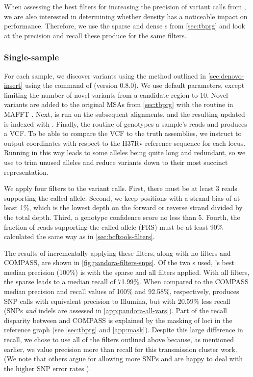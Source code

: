 When assessing the best filters for increasing the precision of variant calls from \pandora{}, we are also interested in determining whether \panrg{} density has a noticeable impact on performance. Therefore, we use the sparse and dense \panrg{}s from \autoref{sec:tbprg} and look at the precision and recall these produce for the same filters.

\subsubsection{Single-sample}
\label{sec:map-var-calls}

For each sample, we discover \denovo{} variants using the method outlined in \autoref{sec:denovo-insert} using the  command of \pandora{} (version 0.8.0). We use default parameters, except limiting the number of novel variants from a candidate region to 10. Novel variants are added to the original MSAs from \autoref{sec:tbprg} with the  routine in MAFFT \cite{katoh2012}. Next, \makeprg{} is run on the subsequent alignments, and the resulting updated \panrg{} is indexed with \pandora{}. Finally, the  routine of \pandora{} genotypes a sample's reads and produces a VCF. To be able to compare the \pandora{} VCF to the truth assemblies, we instruct \pandora{} to output coordinates with respect to the H37Rv reference sequence for each locus. Running \pandora{} in this way leads to some alleles being quite long and redundant, so we use  to trim unused alleles and reduce variants down to their most succinct representation. 

We apply four filters to the \pandora{} variant calls. First, there must be at least 3 reads supporting the called allele. Second, we keep positions with a strand bias of at least 1\%, which is the lowest depth on the forward or reverse strand divided by the total depth. Third, a genotype confidence score no less than 5. Fourth, the fraction of reads supporting the called allele (FRS) must be at least 90\%  - calculated the same way as in \autoref{sec:bcftools-filters}.

The results of incrementally applying these filters, along with no filters and COMPASS, are shown in \autoref{fig:pandora-filters-snps}. Of the two \panrg{}s used, \pandora{}'s best median precision (100\%) is with the sparse \panrg{} and all filters applied. With all filters, the sparse \panrg{} leads to a median recall of 71.99\%. When compared to the COMPASS median precision and recall values of 100\% and 92.58\%, respectively, \pandora{} produces \ont{} SNP calls with equivalent precision to Illumina, but with 20.59\% less recall (SNPs \emph{and} indels are assessed in \autoref{app:pandora-all-vars}). Part of the recall disparity between \pandora{} and COMPASS is explained by the masking of loci in the reference graph (see \autoref{sec:tbprg} and \autoref{app:mask}). Despite this large difference in recall, we chose to use all of the filters outlined above because, as mentioned earlier, we value \ont{} precision more than recall for this transmission cluster work. (We note that others argue for allowing more SNPs and are happy to deal with the higher SNP error rates \cite{walter2020}).

